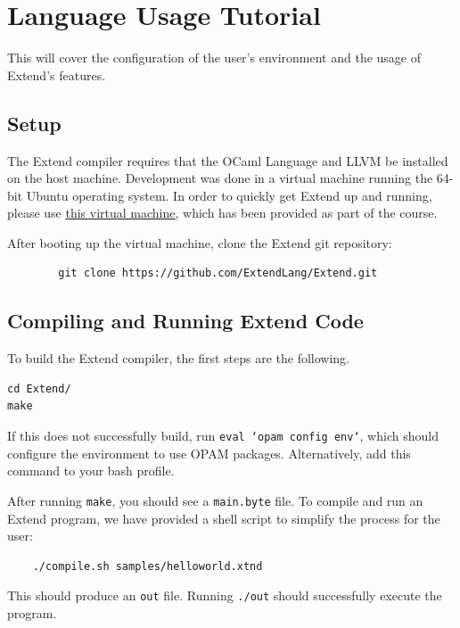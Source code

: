 \chapter{Language Usage Tutorial}

This will cover the configuration of the user's environment and the usage of Extend's features.

\section{Setup}
The Extend compiler requires that the OCaml Language and LLVM be installed on the host machine. Development was done in a virtual machine running the 64-bit Ubuntu operating system. In order to quickly get Extend up and running, please use \underline{\href{https://courseworks2.columbia.edu/courses/10787/files/673708/download}{this virtual machine}}, which has been provided as part of the course.

	\medskip \noindent After booting up the virtual machine, clone the Extend git repository:

	\begin{lstlisting}
		git clone https://github.com/ExtendLang/Extend.git
	\end{lstlisting}

\section{Compiling and Running Extend Code}
To build the Extend compiler, the first steps are the following.

	\begin{lstlisting}
cd Extend/
make
	\end{lstlisting}

	\medskip \noindent
	If this does not successfully build, run \texttt{eval `opam config env`}, which should configure the environment to use OPAM packages. Alternatively, add this command to your bash profile.

	 \medskip \noindent
	 After running \texttt{make}, you should see a \texttt{main.byte} file. To compile and run an Extend program, we have provided a shell script to simplify the process for the user:

	\begin{lstlisting}
	./compile.sh samples/helloworld.xtnd
	\end{lstlisting}

	\medskip \noindent
	This should produce an \texttt{out} file. Running \texttt{./out} should successfully execute the program.

